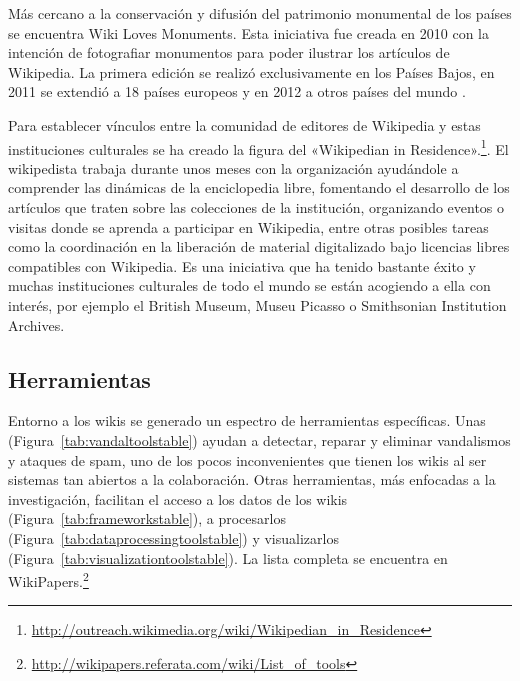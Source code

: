 \documentclass[11pt,onecolumn]{article}
\begin{document}

Más cercano a la conservación y difusión del patrimonio monumental de los países se encuentra Wiki Loves Monuments. Esta iniciativa fue creada en 2010 con la intención de fotografiar monumentos para poder ilustrar los artículos de Wikipedia. La primera edición se realizó exclusivamente en los Países Bajos, en 2011 se extendió a 18 países europeos y en 2012 a otros países del mundo \citep{rodriguez2012wlm}.



Para establecer vínculos entre la comunidad de editores de Wikipedia y estas instituciones culturales se ha creado la figura del «Wikipedian in Residence».\footnote{\href{http://outreach.wikimedia.org/wiki/Wikipedian_in_Residence}{http://outreach.wikimedia.org/wiki/Wikipedian\_in\_Residence}}. El wikipedista trabaja durante unos meses con la organización ayudándole a comprender las dinámicas de la enciclopedia libre, fomentando el desarrollo de los artículos que traten sobre las colecciones de la institución, organizando eventos o visitas donde se aprenda a participar en Wikipedia, entre otras posibles tareas como la coordinación en la liberación de material digitalizado bajo licencias libres compatibles con Wikipedia. Es una iniciativa que ha tenido bastante éxito y muchas instituciones culturales de todo el mundo se están acogiendo a ella con interés, por ejemplo el British Museum, Museu Picasso o Smithsonian Institution Archives.

\subsection{Herramientas}


Entorno a los wikis se generado un espectro de herramientas específicas. Unas (Figura~\ref{tab:vandaltoolstable}) ayudan a detectar, reparar y eliminar vandalismos y ataques de spam, uno de los pocos inconvenientes que tienen los wikis al ser sistemas tan abiertos a la colaboración. Otras herramientas, más enfocadas a la investigación, facilitan el acceso a los datos de los wikis (Figura~\ref{tab:frameworkstable}), a procesarlos (Figura~\ref{tab:dataprocessingtoolstable}) y visualizarlos (Figura~\ref{tab:visualizationtoolstable}). La lista completa se encuentra en WikiPapers.\footnote{\href{http://wikipapers.referata.com/wiki/List_of_tools}{http://wikipapers.referata.com/wiki/List\_of\_tools}}
\end{document}
